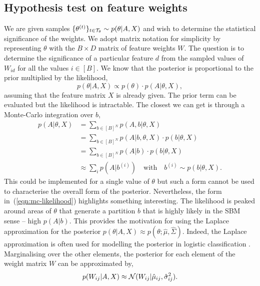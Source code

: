 \subsection{Hypothesis test on feature weights}
\label{appdx:hyp-test}

We are given samples $\{\theta^{(t)}\}_{t \in \mathcal{T}_\theta} \sim p(\theta | A, X)$ and wish to determine the statistical significance of the weights. We adopt matrix notation for simplicity by representing $\theta$ with the $B \times D$ matrix of feature weights $W$. The question is to determine the significance of a particular feature $d$ from the sampled values of $W_{id}$ for all the values $i \in [B]$. We know that the posterior is proportional to the prior multiplied by the likelihood,
%
\begin{equation}
	p(\theta|A, X) \propto p(\theta) \cdot p(A | \theta, X),
\end{equation}
%
assuming that the feature matrix $X$ is already given. The prior term can be evaluated but the likelihood is intractable. The closest we can get is through a Monte-Carlo integration over $b$,
%
\begin{align}
	p(A | \theta, X) &= \sum_{b \in [B]^N} p(A, b | \theta, X) \nonumber \\
	&= \sum_{b \in [B]^N} p(A | b, \theta, X) \cdot p(b | \theta, X) \nonumber \\
	&= \sum_{b \in [B]^N} p(A | b) \cdot p(b | \theta, X) \nonumber \\
	&\approx \sum_{i} p\left( A | b^{(i)} \right) \quad \textrm{with} \quad b^{(i)} \sim p(b| \theta, X).
	\label{eqn:mc-likelihood}
\end{align}
%
This could be implemented for a single value of $\theta$ but such a form cannot be used to characterise the overall form of the posterior. Nevertheless, the form in~(\ref{eqn:mc-likelihood}) highlights something interesting. The likelihood is peaked around areas of $\theta$ that generate a partition $b$ that is highly likely in the SBM sense -- high $p(A|b)$. This provides the motivation for using the Laplace approximation for the posterior $p(\theta | A, X) \approx p(\theta; \hat{\mu}, \hat{\Sigma})$. Indeed, the Laplace approximation is often used for modelling the posterior in logistic classification \cite{laplace}. Marginalising over the other elements, the posterior for each element of the weight matrix $W$ can be approximated by,
%
\begin{equation}
	p(W_{ij}|A, X) \approx \mathcal{N}(W_{ij}|\hat{\mu}_{ij}, \hat{\sigma}_{ij}^2).
\end{equation}

